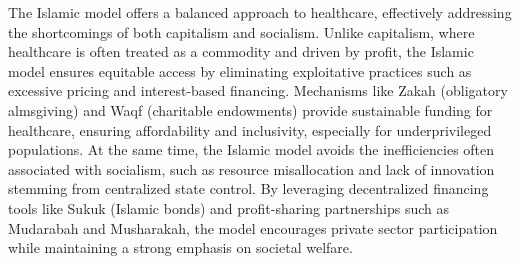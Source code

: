 \par
The Islamic model offers a balanced approach to healthcare, effectively addressing the shortcomings of both capitalism and socialism. Unlike capitalism, where healthcare is often treated as a commodity and driven by profit, the Islamic model ensures equitable access by eliminating exploitative practices such as excessive pricing and interest-based financing. Mechanisms like Zakah (obligatory almsgiving) and Waqf (charitable endowments) provide sustainable funding for healthcare, ensuring affordability and inclusivity, especially for underprivileged populations. At the same time, the Islamic model avoids the inefficiencies often associated with socialism, such as resource misallocation and lack of innovation stemming from centralized state control. By leveraging decentralized financing tools like Sukuk (Islamic bonds) and profit-sharing partnerships such as Mudarabah and Musharakah, the model encourages private sector participation while maintaining a strong emphasis on societal welfare.  
